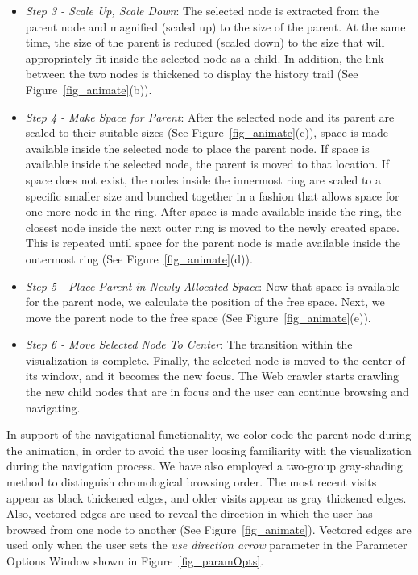 \documentclass[]{article}
\begin{document}
{\begin{itemize}
\item {\em Step 3 - Scale Up, Scale Down}: The selected node is extracted from the parent node and magnified (scaled up) to the size of the parent.  At the same time, the size of the parent is reduced (scaled down) to the size that will appropriately fit inside the selected node as a child.  In addition, the link between the two nodes is thickened to display the history trail (See Figure~\ref{fig_animate}(b)).

\item {\em Step 4 - Make Space for Parent}: After the selected node and its parent are scaled to their suitable sizes (See Figure~\ref{fig_animate}(c)), space is made available inside the selected node to place the parent node.  If space is available inside the selected node, the parent is moved to that location.  If space does not exist, the nodes inside the innermost ring are scaled to a specific smaller size and bunched together in a fashion that allows space for one more node in the ring.  After space is made available inside the ring, the closest node inside the next outer ring is moved to the newly created space.  This is repeated until space for the parent node is made available inside the outermost ring (See Figure~\ref{fig_animate}(d)). 

\item{\em Step 5 - Place Parent in Newly Allocated Space}: Now that space is available for the parent node, we calculate the position of the free space.  Next, we move the parent node to the free space (See Figure~\ref{fig_animate}(e)).

\item{\em Step 6 - Move Selected Node To Center}: The transition within the visualization is complete.
Finally, the selected node is moved to the center of its window, and it becomes the new focus.
The Web crawler starts crawling the new child nodes that are in focus and the user can continue browsing and navigating.

\end{itemize}

In support of the navigational functionality, we color-code the parent node during the animation, in order to avoid the user loosing familiarity with the visualization during the navigation process.
We have also employed a two-group gray-shading method to distinguish chronological browsing order.
The most recent visits appear as black thickened edges, and older visits appear as gray thickened edges.
Also, vectored edges are used to reveal the direction in which the user has browsed from one node to another (See Figure~\ref{fig_animate}).
Vectored edges are used only when the user sets the {\em use direction arrow} parameter in the Parameter Options Window shown in Figure~\ref{fig_paramOpts}.

}
\end{document}
